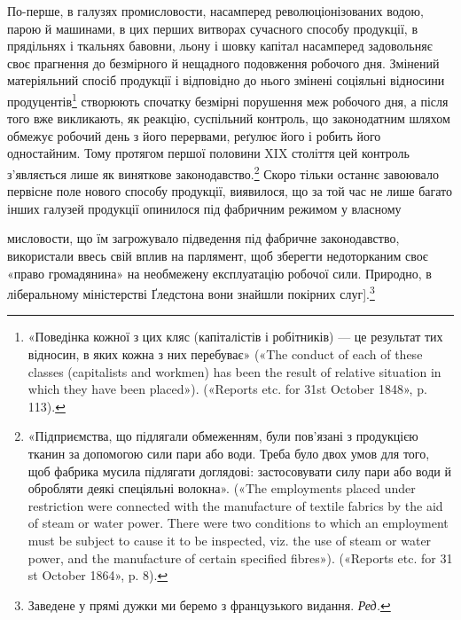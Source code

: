 По-перше, в галузях промисловости, насамперед революціонізованих
водою, парою й машинами, в цих перших витворах сучасного
способу продукції, в прядільнях і ткальнях бавовни,
льону і шовку капітал насамперед задовольняє своє прагнення
до безмірного й нещадного подовження робочого дня. Змінений
матеріяльний спосіб продукції і відповідно до нього змінені
соціяльні відносини продуцентів\footnote{
«Поведінка кожної з цих кляс (капіталістів і робітників) — це
результат тих відносин, в яких кожна з них перебуває» («The conduct
of each of these classes (capitalists and workmen) has been the result of
relative situation in which they have been placed»). («Reports etc. for 31st
October 1848», p. 113).
} створюють спочатку безмірні
порушення меж робочого дня, а після того вже викликають,
як реакцію, суспільний контроль, що законодатним шляхом
обмежує робочий день з його перервами, реґулює його і робить
його одностайним. Тому протягом першої половини XIX століття
цей контроль з’являється лише як виняткове законодавство.\footnote{
«Підприємства, що підлягали обмеженням, були пов’язані з
продукцією тканин за допомогою сили пари або води. Треба було двох
умов для того, щоб фабрика мусила підлягати доглядові: застосовувати
силу пари або води й обробляти деякі спеціяльні волокна». («The employments
placed under restriction were connected with the manufacture of
textile fabrics by the aid of steam or water power. There were two conditions
to which an employment must be subject to cause it to be inspected,
viz. the use of steam or water power, and the manufacture of certain specified
fibres»). («Reports etc. for 31 st October 1864», p. 8).
}
Скоро тільки останнє завоювало первісне поле нового способу
продукції, виявилося, що за той час не лише багато інших галузей
продукції опинилося під фабричним режимом у власному

мисловости, що їм загрожувало підведення під фабричне законодавство,
використали ввесь свій вплив на парлямент, щоб зберегти недоторканим
своє «право громадянина» на необмежену експлуатацію робочої сили.
Природно, в ліберальному міністерстві Ґледстона вони знайшли покірних
слуг].\footnote*{
Заведене у прямі дужки ми беремо з французького видання. \emph{Ред.}
}
\parbreak{}  %

